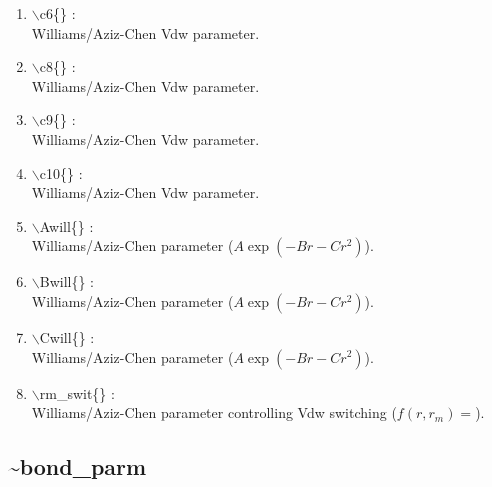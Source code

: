 \documentclass[12pt,titlepage]{article}
\begin{document}
\begin{enumerate}
 \vspace{0.15in} 
 \item  $\backslash$c6\{\} : \\ 
    Williams/Aziz-Chen Vdw parameter.

 \vspace{0.15in} 
 \item  $\backslash$c8\{\} : \\ 
    Williams/Aziz-Chen Vdw parameter.

 \vspace{0.15in} 
 \item  $\backslash$c9\{\} : \\ 
    Williams/Aziz-Chen Vdw parameter.

 \vspace{0.15in} 
 \item  $\backslash$c10\{\} : \\ 
    Williams/Aziz-Chen Vdw parameter.

 \vspace{0.15in} 
 \item  $\backslash$Awill\{\} : \\ 
    Williams/Aziz-Chen parameter ($A\exp(-Br-Cr^2)$).

 \vspace{0.15in} 
 \item  $\backslash$Bwill\{\} : \\ 
    Williams/Aziz-Chen parameter ($A\exp(-Br-Cr^2)$).

 \vspace{0.15in} 
 \item  $\backslash$Cwill\{\} : \\ 
    Williams/Aziz-Chen parameter ($A\exp(-Br-Cr^2)$).

 \vspace{0.15in} 
 \item  $\backslash$rm\_swit\{\} : \\ 
    Williams/Aziz-Chen parameter controlling Vdw switching 
   ($f(r,r_m) = $).

\end{enumerate}

\newpage
\subsection*{\bf \~{}bond\_parm}
\end{document}
